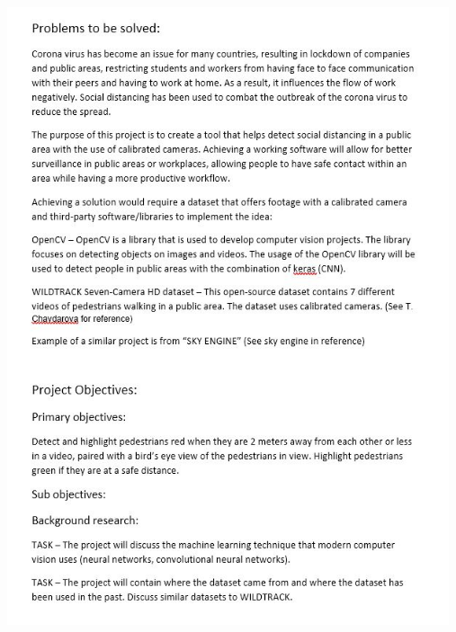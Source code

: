 \documentclass[12pt]{report}
\begin{document}
\includegraphics[width=130mm]{./images/appendix/PDD1.JPG}
\end{document}
